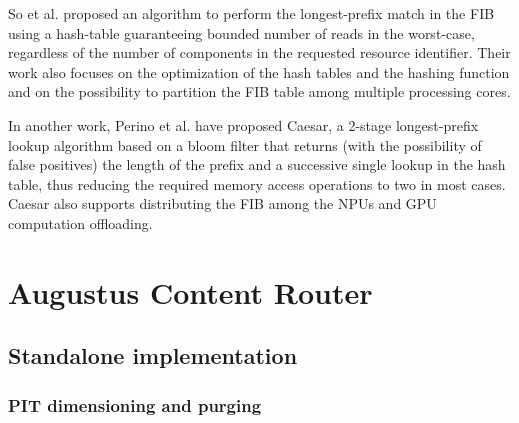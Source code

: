 \documentclass[12pt,a4paper,twoside]{book}
\begin{document}
So et al.\cite{ndn_fast_dosresistant} proposed an algorithm to perform the longest-prefix match in the \gls{FIB} using a hash-table guaranteeing bounded number of reads in the worst-case, regardless of the number of components in the requested resource identifier. Their work also focuses on the optimization of the hash tables and the hashing function and on the possibility to partition the \gls{FIB} table among multiple processing cores.

In another work, Perino et al.\cite{caesar} have proposed Caesar, a 2-stage longest-prefix lookup algorithm based on a bloom filter that returns (with the possibility of false positives) the length of the prefix and a successive single lookup in the hash table, thus reducing the required memory access operations to two in most cases. Caesar also supports distributing the \gls{FIB} among the NPUs and GPU computation offloading.




\chapter{Augustus Content Router}
\label{chap:augustus}


\section{Standalone implementation}\label{sec:augustus.standalone}



\subsection{PIT dimensioning and purging}\label{sec:augustus.standalone.pit}
\end{document}
